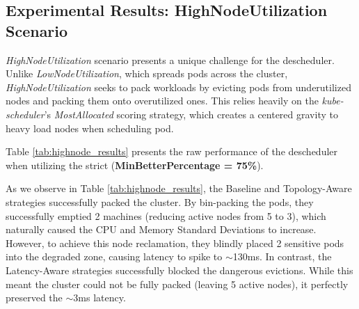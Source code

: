 \subsection{Experimental Results: HighNodeUtilization Scenario}
\label{subsec:netaware4_resultanalysis2}
\textit{HighNodeUtilization} scenario presents a unique challenge for the descheduler. Unlike \textit{LowNodeUtilization}, which spreads pods across the cluster, \textit{HighNodeUtilization} seeks to pack workloads by evicting pods from underutilized nodes and packing them onto overutilized ones. This relies heavily on the \textit{kube-scheduler}'s \textit{MostAllocated} scoring strategy, which creates a centered gravity to heavy load nodes when scheduling pod.

Table \ref{tab:highnode_results} presents the raw performance of the descheduler when utilizing the strict (\textbf{MinBetterPercentage = 75\%}).
\begin{table}[H]
    \centering
    \caption{Descheduler Performance: HighNodeUtilization Scenario}
    \label{tab:highnode_results}
\end{table}

As we observe in Table \ref{tab:highnode_results}, the Baseline and Topology-Aware strategies successfully packed the cluster. By bin-packing the pods, they successfully emptied 2 machines (reducing active nodes from 5 to 3), which naturally caused the CPU and Memory Standard Deviations to increase. However, to achieve this node reclamation, they blindly placed 2 sensitive pods into the degraded zone, causing latency to spike to $\sim$130ms. In contrast, the Latency-Aware strategies successfully blocked the dangerous evictions. While this meant the cluster could not be fully packed (leaving 5 active nodes), it perfectly preserved the $\sim$3ms latency.

